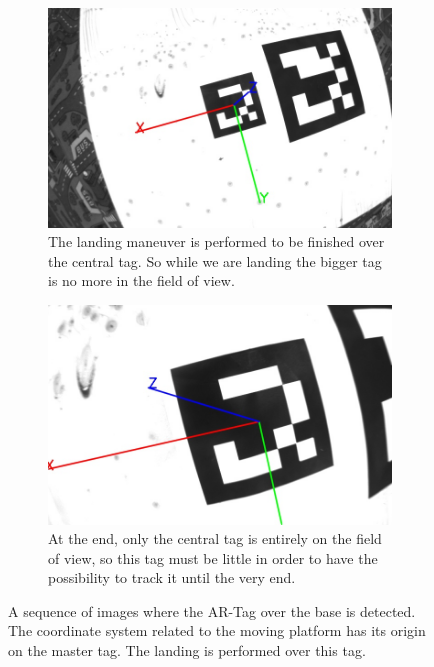 \begin{figure}[!htbp]
    \begin{subfigure}[b]{0.45\textwidth}
        \includegraphics[width=\textwidth]{img/frame4.jpg}
        \caption{The landing maneuver is performed to be finished over the central tag. So while we are landing the bigger tag is no more in the field of view. }
        \label{fig:five}
   \end{subfigure}\hfill
    \begin{subfigure}[b]{0.45\textwidth}
        \includegraphics[width=\textwidth]{img/frame5.jpg}
        \caption{At the end, only the central tag is entirely on the field of view, so this tag must be little in order to have the possibility to track it until the very end.}
        \label{fig:six}
   \end{subfigure}
   
  \caption{A sequence of images where the AR-Tag over the base is detected. The coordinate system related to the moving platform has its origin on the master tag. The landing is performed over this tag.}
  \label{fig:arsys}
\end{figure} 


